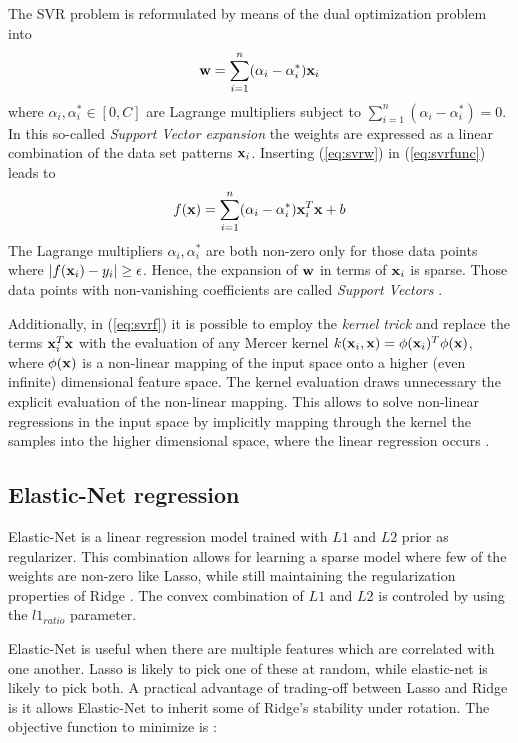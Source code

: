 The SVR problem is reformulated by means of the dual optimization
problem into
\begin{equation}
  \label{eq:svrw}
  \mathbf{w}=\sum_{i=1}^n(\alpha_i-\alpha_i^\ast)\mathbf{x}_i
\end{equation}
where $\alpha_i,\alpha_i^\ast\in[0,C]$ are Lagrange multipliers
subject to $\sum_{i=1}^n(\alpha_i-\alpha_i^\ast)=0$.
%
In this so-called \emph{Support Vector expansion} the weights are
expressed as a linear combination of the data set patterns
$\mathbf{x}_i$.
%
Inserting (\ref{eq:svrw}) in (\ref{eq:svrfunc}) leads to
\begin{equation}
  \label{eq:svrf}
 f(\mathbf{x}) = \sum_{i=1}^n(\alpha_i-\alpha_i^\ast)\mathbf{x}_i^T\mathbf{x} + b
\end{equation}
The Lagrange multipliers $\alpha_i,\alpha_i^\ast$ are both non-zero
only for those data points where $|f(\mathbf{x}_i) - y_i|\geq\epsilon$.
Hence, the expansion of $\mathbf{w}$ in terms of $\mathbf{x}_i$ is sparse.
Those data points with non-vanishing coefficients are called
\emph{Support Vectors} \citep{Wei2013}.

Additionally, in (\ref{eq:svrf}) it is possible to employ the
\emph{kernel trick} and replace the terms $\mathbf{x}_i^T\mathbf{x}$ with
the evaluation of any Mercer kernel
$k(\mathbf{x}_i,\mathbf{x})=\phi(\mathbf{x}_i)^T\phi(\mathbf{x})$, where
$\phi(\mathbf{x})$ is a non-linear mapping of the input space onto a
higher (even infinite) dimensional feature space.
%
The kernel evaluation draws unnecessary the explicit evaluation of the
non-linear mapping.
%
This allows to solve non-linear regressions in the input space by
implicitly mapping through the kernel the samples into the higher
dimensional space, where the linear regression occurs \citep{Alonso2013}.


\subsection{Elastic-Net regression}

Elastic-Net is a linear regression model trained with $L1$ and $L2$ prior as regularizer. This combination allows for learning a sparse model where few of the weights are non-zero like Lasso, while still maintaining the regularization properties of Ridge  \citep{scikitlearn2011}. The convex combination of $L1$ and $L2$ is controled by using the $l1_{ratio}$ parameter.

Elastic-Net is useful when there are multiple features which are correlated with one another. Lasso is likely to pick one of these at random, while elastic-net is likely to pick both.
A practical advantage of trading-off between Lasso and Ridge is it allows Elastic-Net to inherit some of Ridge’s stability under rotation. The objective function to minimize is \citep{scikitlearn2011}:

